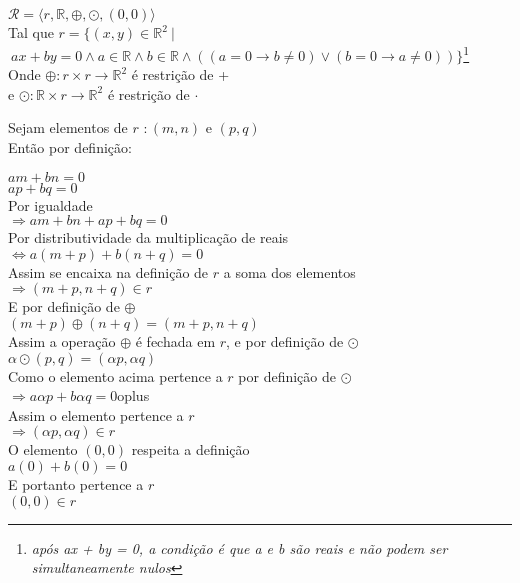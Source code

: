 \documentclass[12pt, twoside, a4]{article} %
\begin{document}
\begin{center}
    \begin{doublespacing} \vspace{-0.8cm}
        $ \mathcal{R} = \langle r, \mathbb{R},\oplus , \odot , (0,0) \rangle $
        \\
        Tal que $ r = \{  (x, y) \in \mathbb{R}^2 \ | $ \\ $\ ax + by = 0 \wedge a \in \mathbb{R} \wedge b \in \mathbb{R} \wedge ( ( a = 0 \to b \neq 0 ) \vee (b = 0 \to a \neq 0) ) \}  $\footnote{\emph{após ax + by = 0, a condição é que a e b são reais e não podem ser simultaneamente nulos}}
        \\
        Onde $ \oplus : r \times r \to \mathbb{R}^2 $ é restrição de +
        \\
        e $ \odot : \mathbb{R} \times r \to \mathbb{R}^2$ é restrição de $\cdot$
    \end{doublespacing}
\end{center}
\noindent
Sejam elementos de $r$ $: (m, n)$ e $ (p, q) $ \\
Então por definição:
\vspace{-0.5cm}
\begin{center}
    \begin{doublespacing}
        $ am + bn = 0$ 
        \\
        $ ap + bq = 0 $ 
        \\
        Por igualdade
        \\
        $\Rightarrow am + bn + ap + bq = 0$ 
        \\
        Por distributividade da multiplicação de reais
        \\
        $\Leftrightarrow  a(m + p) + b(n + q) = 0 $
        \\
        Assim se encaixa na definição de $r$ a soma dos elementos
        \\
        $\Rightarrow  (m+p, n + q) \in r$
        \\
        E por definição de $ \oplus $
        \\
        $(m+p) \oplus (n+q) = (m+p, n+q) $
        \\
        Assim a operação $ \oplus $ é fechada em $ r $, e por definição de $\odot$
        \\
        $ \alpha \odot (p,q) = (\alpha p , \alpha q) $
        \\
        Como o elemento acima pertence a $r$ por definição de $\odot$
        \\
        $\Rightarrow a \alpha p +b \alpha q = 0$oplus
        \\
        Assim o elemento pertence a $r$
        \\
        $ \Rightarrow (\alpha p , \alpha q) \in r $
        \\
        O elemento $(0,0)$ respeita a definição
        \\
        $a(0) + b(0) = 0$
        \\
        E portanto pertence a $r$
        \\
        $(0,0) \in r$

    \end{doublespacing}
\end{center}
\end{document}
